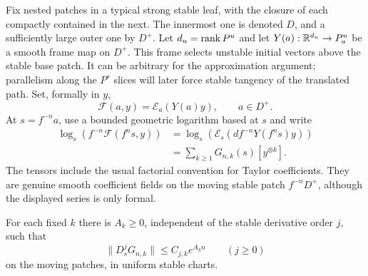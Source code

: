 Fix nested patches in a typical strong stable leaf, with the closure
of each compactly contained in the next. The innermost one is
denoted $D$, and a sufficiently large outer one by $D^+$. Let
$d_u=\operatorname{rank} P^u$ and let $Y(a):\mathbb R^{d_u}\to P^u_a$ be a smooth
frame map on $D^+$. This frame selects unstable initial vectors above
the stable base patch. It can be arbitrary for the approximation
argument; parallelism along the $P^s$ slices will later force stable
tangency of the translated path. Set, formally in $y$,
\[
 \mathcal F(a,y)=\mathcal E_a(Y(a)y),
 \qquad a\in D^+.
\]
At $s=f^{-n}a$, use a bounded geometric logarithm based at $s$ and
write
\begin{equation}\label{real:pulled-jet}
 \begin{split}
 \log_s\!\left(f^{-n}\mathcal F(f^n s,y)\right)
 &=\log_s\!\left(
       \mathcal E_s(df^{-n}Y(f^n s)y)\right)\\
 &=\sum_{k\ge1}G_{n,k}(s)[y^{\otimes k}].
 \end{split}
\end{equation}
The tensors include the usual factorial convention for Taylor
coefficients. They are genuine smooth coefficient fields on the
moving stable patch $f^{-n}D^+$, although the displayed series is
only formal.

\begin{lemma}\label{real:naive}
For each fixed $k$ there is $A_k\ge0$, independent of the stable
derivative order $j$, such that
\begin{equation}\label{real:naive-estimate}
 \|D_s^jG_{n,k}\|\le C_{j,k}e^{A_kn}
 \qquad(j\ge0)
\end{equation}
on the moving patches, in uniform stable charts.
\end{lemma}

